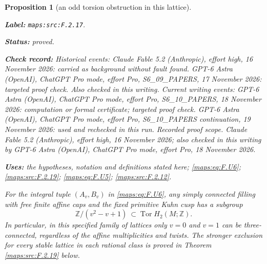 \documentclass[11pt,a4paper]{article}
\newtheorem{proposition}[proposition]{Proposition}
\theoremstyle{definition}
\newcommand{\StatementRecord}[4]{\par\smallskip\begingroup\upshape\raggedright\noindent\textbf{Label:} \nolinkurl{#1}.\par\noindent\textbf{Status:} #2.\par\noindent\textbf{Check record:} #3.\par\noindent\textbf{Uses:} #4.\par\endgroup\smallskip}
\begin{document}
\begin{proposition}[an odd torsion obstruction in this lattice]\label{maps:src:F.2.17}
\StatementRecord{maps:src:F.2.17}{proved}{Historical events: Claude Fable 5.2 (Anthropic), effort high, 16 November 2026: carried as background without fault found. GPT-6 Astra (OpenAI), ChatGPT Pro mode, effort Pro, S6\_09\_PAPERS, 17 November 2026: targeted proof check. Also checked in this writing. Current writing events: GPT-6 Astra (OpenAI), ChatGPT Pro mode, effort Pro, S6\_10\_PAPERS, 18 November 2026: computation or formal certificate; targeted proof check. GPT-6 Astra (OpenAI), ChatGPT Pro mode, effort Pro, S6\_10\_PAPERS continuation, 19 November 2026: used and rechecked in this run. \emph{Recorded proof scope.} Claude Fable 5.2 (Anthropic), effort high, 16 November 2026; also checked in this writing by GPT-6 Astra (OpenAI), ChatGPT Pro mode, effort Pro, 18 November 2026}{the hypotheses, notation and definitions stated here; \cref{maps:eq:F.U6}; \cref{maps:src:F.2.19}; \cref{maps:eq:F.U5}; \cref{maps:src:F.2.12}}


For the integral tuple $(A_v,B_v)$ in \eqref{maps:eq:F.U6}, any simply
connected filling with free finite affine caps and the fixed
primitive Kuhn cusp has a subgroup
\[
 \mathbb Z/(v^2-v+1)\ \subset\operatorname{Tor}H_2(M;\mathbb Z).
 \tag{F.U9}\label{maps:eq:F.U9}
\]
In particular, in this specified family of lattices only
$v=0$ and $v=1$ can be three-connected, regardless of the
affine multiplicities and twists.  The stronger exclusion for every stable lattice in each
rational class is proved in Theorem \ref{maps:src:F.2.19} below.

\end{proposition}
\end{document}
